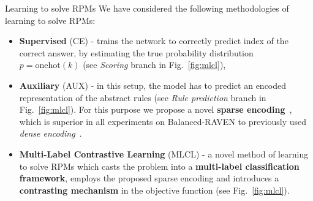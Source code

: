 \documentclass[final]{beamer}
\newlength{\colwidth}
\begin{document}
\begin{frame}[t]
\begin{columns}[t]
\begin{column}{\colwidth}
                \begin{alertblock}{Learning to solve RPMs}
                    We have considered the following methodologies of learning to solve RPMs:
                    \begin{itemize}
                        \item \textbf{Supervised} (CE) - trains the network to correctly predict index of the correct answer, by estimating the true probability distribution $p=\text{onehot}(k)$ (see \textit{Scoring} branch in Fig.~\ref{fig:mlcl}),
                        \item \textbf{Auxiliary} (AUX) - in this setup, the model has to predict an encoded representation of the abstract rules (see \textit{Rule prediction} branch in Fig.~\ref{fig:mlcl}). For this purpose we propose a novel \textbf{sparse encoding}~\cite{malkinski2020multi}, which is superior in all experiments on Balanced-RAVEN to previously used \textit{dense encoding}~\cite{santoro2018measuring,zhang2019raven}.
                        \item \textbf{Multi-Label Contrastive Learning} (MLCL) - a novel method of learning to solve RPMs which casts the problem into a \textbf{multi-label classification framework}, employs the proposed sparse encoding and introduces a \textbf{contrasting mechanism} in the objective function (see Fig.~\ref{fig:mlcl}).
                    \end{itemize}
                \end{alertblock}


\end{column}
\end{columns}
\end{frame}
\end{document}
